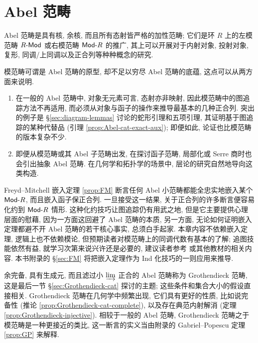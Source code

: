 
\chapter{Abel 范畴}\label{sec:Abel-cat}
Abel 范畴是具有核, 余核, 而且所有态射皆严格的加性范畴; 它们是环 $R$ 上的左模范畴 $R\text{-}\mathsf{Mod}$ 或右模范畴 $\mathsf{Mod}\text{-}R$ 的推广, 其上可以开展对于内射对象, 投射对象, 复形, 同调/上同调以及正合列等种种概念的研究.

模范畴可谓是 Abel 范畴的原型, 却不足以穷尽 Abel 范畴的底蕴, 这点可以从两方面来说明.
\begin{enumerate}
	\item 在一般的 Abel 范畴中, 对象无元素可言, 态射亦非映射, 因此模范畴中的图追踪方法不再适用, 而必须从对象与函子的操作来推导最基本的几种正合列. 突出的例子是 \S\ref{sec:diagram-lemmas} 讨论的蛇形引理和五项引理, 其证明基于图追踪的某种代替品 (引理 \ref{prop:Abel-cat-exact-aux}); 即便如此, 论证也比模范畴的版本复杂不少.
	
	\item 即便从模范畴或其 Abel 子范畴出发, 在探讨函子范畴, 局部化或 Serre 商时也会引出抽象 Abel 范畴. 在几何学和拓扑学的场景中, 层论的研究自然地导向这类构造.
\end{enumerate}

Freyd--Mitchell 嵌入定理 \ref{prop:FM} 断言任何 Abel 小范畴都能全忠实地嵌入某个 $\mathsf{Mod}\text{-}R$, 而且嵌入函子保正合列. 一旦接受这一结果, 关于正合列的许多断言便容易化约到 $\mathsf{Mod}\text{-}R$ 情形. 这种化约技巧让图追踪仍有用武之地, 但是它主要提供心理层面的慰藉, 因为一方面这回避了 Abel 范畴的本质, 另一方面, 无论如何证明嵌入定理都避不开 Abel 范畴的若干核心事实, 总须白手起家. 本章内容不依赖嵌入定理, 逻辑上也不依赖模论, 但预期读者对模范畴上的同调代数有基本的了解; 追图技能依然有益, 就学习次第来说兴许还是必要的, 建议读者参考 \cite{Li1} 或其他教材的相关内容. 本书附录的 \S\ref{sec:FM} 将把嵌入定理作为 Ind 化技巧的一则应用来推导.

余完备, 具有生成元, 而且滤过小 $\varinjlim$ 正合的 Abel 范畴称为 Grothendieck 范畴, 这是最后一节 \S\ref{sec:Grothendieck-cat} 探讨的主题; 这些条件和集合大小的假设直接相关. Grothendieck 范畴在几何学中频繁出现, 它们具有更好的性质, 比如说完备性 (推论 \ref{prop:Grothendieck-cat-complete}), 以及存在典范内射解消 (定理 \ref{prop:Grothendieck-injective}). 相较于一般的 Abel 范畴, Grothendieck 范畴之于模范畴是一种更接近的类比, 这一断言的实义当由附录的 Gabriel--Popescu 定理 \ref{prop:GP} 来解释.

